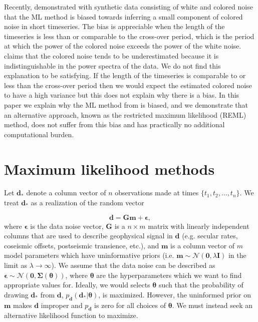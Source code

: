 \documentclass[10pt,a4paper]{article}
\begin{document}
Recently, \citet{Langbein2012} demonstrated with synthetic data consisting of white and colored noise that the ML method is biased towards inferring a small component of colored noise in short timeseries.  The bias is appreciable when the length of the timeseries is less than or comparable to the cross-over period, which is the period at which the power of the colored noise exceeds the power of the white noise. \citet{Langbein2012} claims that the colored noise tends to be underestimated because it is indistinguishable in the power spectra of the data. We do not find this explanation to be satisfying. If the length of the timeseries is comparable to or less than the cross-over period then we would expect the estimated colored noise to have a high variance but this does not explain why there is a bias. In this paper we explain why the ML method from \citet{Langbein1997} is biased, and we demonstrate that an alternative approach, known as the restricted maximum likelihood (REML) method, does not suffer from this bias and has practically no additional computational burden. 

\section{Maximum likelihood methods}

Let $\mathbf{d_*}$ denote a column vector of $n$ observations made at times $\{t_1,t_2,\dots,t_n\}$. We treat $\mathbf{d_*}$ as a realization of the random vector

\begin{equation}\label{LangbeinModel}
  \mathbf{d} = \mathbf{Gm} + \mathbf{\epsilon},
\end{equation}
where $\mathbf{\epsilon}$ is the data noise vector, $\mathbf{G}$ is a $n \times m$ matrix with linearly independent columns that are used to describe geophysical signal in $\mathbf{d}$ (e.g. secular rates, coseismic offsets, postseismic transience, etc.), and $\mathbf{m}$ is a column vector of $m$ model parameters which have uninformative priors (i.e. $\mathbf{m} \sim \mathcal{N}(\mathbf{0},\lambda\mathbf{I})$ in the limit as $\lambda \to \infty$).  We assume that the data noise can be described as $\mathbf{\epsilon} \sim \mathcal{N}(\mathbf{0},\mathbf{\Sigma}(\mathbf{\theta}))$, where $\mathbf{\theta}$ are the hyperparameters which we want to find appropriate values for. Ideally, we would selects $\mathbf{\theta}$ such that the probability of drawing $\mathbf{d_*}$ from $\mathbf{d}$, $p_\mathbf{d}(\mathbf{d_*}|\mathbf{\theta})$, is maximized. However, the uninformed prior on $\mathbf{m}$ makes $\mathbf{d}$ improper and $p_\mathbf{d}$ is zero for all choices of $\mathbf{\theta}$. We must instead seek an alternative likelihood function to maximize. 
\end{document}
